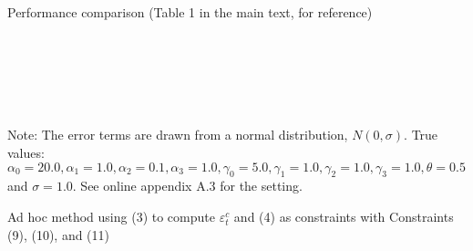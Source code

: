 \documentclass[11pt, a4paper]{article}
\theoremstyle{remark}
\begin{document}
\begin{table}[!htbp]
  \begin{center}
  \caption{Performance comparison (Table 1 in the main text, for reference)}
    \label{tb:loglinear_loglinear_sigma_1_simultaneous_non_constraint_theta_constraint_bias_rmse} 
  \\[0.5em]
  \begin{adjustbox}{width=\textwidth}
    
  \end{adjustbox}

  \vspace{1em}

  \\[0.5em]
  \begin{adjustbox}{width=\textwidth}
    
  \end{adjustbox}

  \vspace{1em}

  \\[0.5em]
  \begin{adjustbox}{width=\textwidth}
    
  \end{adjustbox}
  \end{center}
  \footnotesize
  Note: The error terms are drawn from a normal distribution, $N(0, \sigma)$. True values: $\alpha_0=20.0, \alpha_1=1.0, \alpha_2=0.1, \alpha_3=1.0, \gamma_0=5.0, \gamma_1=1.0, \gamma_2=1.0, \gamma_3=1.0, \theta=0.5$ and $\sigma=1.0$. See online appendix A.3 for the setting.
\end{table}

\begin{table}[!htbp]
  \begin{center}
  \caption{Ad hoc method using (3) to compute $\varepsilon_t^c$ and (4) as constraints with Constraints (9), (10), and (11)}
  \label{tb:loglinear_loglinear_sigma_1_mpec_theta_constraint_slope_constraint_bias_rmse} 
  \begin{adjustbox}{width=\textwidth}
    
  \end{adjustbox}
  \end{center}
\end{table}
\end{document}
